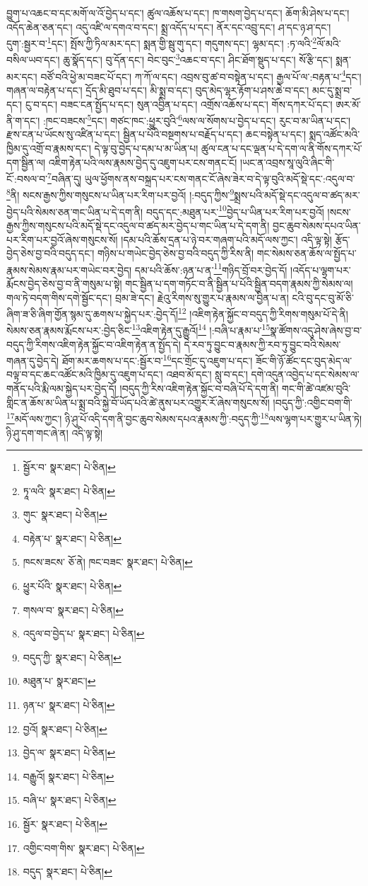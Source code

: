 བྱུག་པ་འཆང་བ་དང་མགོ་ལ་འོ་བྱེད་པ་དང་། ཚུལ་འཆོས་པ་དང་། ཁ་གསག་བྱེད་པ་དང་། ཆོག་མི་ཤེས་པ་དང་། འདོད་ཆེན་ཅན་དང་། འདུ་འཛི་ལ་དགའ་བ་དང་། སྨྲ་འདོད་པ་དང་། ནོར་དང་འབྲུ་དང་། ཤ་དང་ཉ་ཤ་དང་། དུག་:སྦྱར་བ་\footnote{སྦྱོར་བ་  སྣར་ཐང་།  པེ་ཅིན། }དང་། སྤོས་ཀྱི་ཏིལ་མར་དང་། སྨན་གྱི་སྦུ་གུ་དང་། གདུགས་དང་། ལྷམ་དང་། :ཏ་ལའི་\footnote{ཏཱ་ལའི་  སྣར་ཐང་།  པེ་ཅིན། }ལོ་མའི་བསིལ་ཡབ་དང་། ཆུ་སྣོད་དང་། བུ་དོན་དང་། བེང་བུང་\footnote{གུང་  སྣར་ཐང་།  པེ་ཅིན། }འཆང་བ་དང་། ཤིང་ཐོག་སྡུད་པ་དང་། སོ་རྩི་དང་། སྨན་མར་དང་། བཙོ་བའི་ཕྱེ་མ་བཟང་པོ་དང་། ཀ་ཀོ་ལ་དང་། འབྲས་བུ་ཚ་བ་བསྟེན་པ་དང་། རྒྱལ་པོ་ལ་:བརྟན་པ་\footnote{བརྟེན་པ་  སྣར་ཐང་།  པེ་ཅིན། }དང་། གཞན་ལ་བརྟེན་པ་དང་། དྲོད་མི་ཐུབ་པ་དང་། མི་སྨྲ་བ་དང་། བུད་མེད་ལྷར་རྟོག་པ་ཤས་ཆེ་བ་དང་། མང་དུ་སྨྲ་བ་དང་། ངུ་བ་དང་། བཟང་ངན་སྤྱོད་པ་དང་། སུན་འབྱིན་པ་དང་། འགྲོས་འཆོས་པ་དང་། གོས་དཀར་པོ་དང་། ཨར་མོ་ནི་ག་དང་། :ཁང་བཟངས་\footnote{ཁངས་ཟངས་  ཅོ་ནེ། ཁང་བཟང་  སྣར་ཐང་།  པེ་ཅིན། }དང་། གཙང་ཁང་:ཕྱུར་བུའི་\footnote{ཕྱུར་པོའི་  སྣར་ཐང་།  པེ་ཅིན། }ལས་ལ་སོགས་པ་བྱེད་པ་དང་། རུང་བ་མ་ཡིན་པ་དང་། རྫས་ངན་པ་ཡོངས་སུ་འཛིན་པ་དང་། སྦྱིན་པ་པོའི་བསྔགས་པ་བརྗོད་པ་དང་། ཆང་བསྟེན་པ་དང་། སྨད་འཚོང་མའི་ཁྱིམ་དུ་འགྲོ་བ་རྣམས་དང་། དེ་ལྟ་བུ་བྱེད་པ་དམ་པ་མ་ཡིན་པ། ཚུལ་ངན་པ་དང་ལྡན་པ་དེ་དག་ལ་ནི་གོས་དཀར་པོ་དག་སྦྱིན་ལ། འཇིག་རྟེན་པའི་ལས་རྣམས་བྱེད་དུ་འཇུག་པར་ངས་གནང་ངོ། །ཡང་ན་འབྲས་སཱ་ལུའི་ཞིང་གི་ངོ་:བསལ་བ་\footnote{གསལ་བ་  སྣར་ཐང་།  པེ་ཅིན། }བཞིན་དུ། ཡུལ་ཕྱོགས་ནས་བསྐྲད་པར་ངས་གནང་ངོ་ཞེས་ཟེར་བ་དེ་ལྟ་བུའི་མདོ་སྡེ་དང་:འདུལ་བ་\footnote{འདུལ་བ་བྱེད་པ་  སྣར་ཐང་།  པེ་ཅིན། }ནི། སངས་རྒྱས་ཀྱིས་གསུངས་པ་ཡིན་པར་རིག་པར་བྱའོ། །:བདུད་ཀྱིས་\footnote{བདུད་ཀྱི་  སྣར་ཐང་།  པེ་ཅིན། }སྨྲས་པའི་མདོ་སྡེ་དང་འདུལ་བ་ཚད་མར་བྱེད་པའི་སེམས་ཅན་གང་ཡིན་པ་དེ་དག་ནི། བདུད་དང་:མཐུན་པར་\footnote{མཐུན་པ་  སྣར་ཐང་། }བྱེད་པ་ཡིན་པར་རིག་པར་བྱའོ། །སངས་རྒྱས་ཀྱིས་གསུངས་པའི་མདོ་སྡེ་དང་འདུལ་བ་ཚད་མར་བྱེད་པ་གང་ཡིན་པ་དེ་དག་ནི། བྱང་ཆུབ་སེམས་དཔའ་ཡིན་པར་རིག་པར་བྱའོ་ཞེས་གསུངས་སོ། །དམ་པའི་ཆོས་དྲན་པ་ཉེ་བར་གཞག་པའི་མདོ་ལས་ཀྱང་། འདི་ལྟ་སྟེ། རྩོད་བྱེད་ཅེས་བྱ་བའི་བདུད་དང་། གཉིས་པ་གཡེང་བྱེད་ཅེས་བྱ་བའི་བདུད་ཀྱི་རིས་ནི། གང་སེམས་ཅན་ཆོས་ལ་སྤྱོད་པ་རྣམས་སེམས་རྣམ་པར་གཡེང་བར་བྱེད། དམ་པའི་ཆོས་:ཉན་པ་ན་\footnote{ཉན་པ་  སྣར་ཐང་།  པེ་ཅིན། }གཉིད་བྲོ་བར་བྱེད་དོ། །འདོད་པ་ལྷག་པར་རྨོངས་བྱེད་ཅེས་བྱ་བ་ནི་གསུམ་པ་སྟེ། གང་སྦྱིན་པ་དག་གཏོང་བ་ནི་སྦྱིན་པ་པོའི་སྦྱིན་བདག་རྣམས་ཀྱི་སེམས་ལ། གལ་ཏེ་བདག་གིས་དགེ་སྦྱོང་དང་། བྲམ་ཟེ་དང་། རྗེའུ་རིགས་སུ་གྱུར་པ་རྣམས་ལ་བྱིན་པ་ན། ངའི་བུ་དང་བུ་མོ་ཅི་ཞིག་ཟ་ཅི་ཞིག་གྱོན་སྙམ་དུ་ཆགས་པ་སྐྱེད་པར་:བྱེད་དོ།\footnote{བྱའོ།  སྣར་ཐང་།  པེ་ཅིན། } །འཇིག་རྟེན་སྐྱོང་བ་བདུད་ཀྱི་རིགས་གསུམ་པོ་དེ་ནི། སེམས་ཅན་རྣམས་རྨོངས་པར་:བྱེད་ཅིང་\footnote{བྱེད་ལ་  སྣར་ཐང་།  པེ་ཅིན། }འཇིག་རྟེན་དུ་རྒྱུའོ།\footnote{བརྒྱུའོ།  སྣར་ཐང་།  པེ་ཅིན། } །:བཞི་པ་རྣམ་པ་\footnote{བཞི་པ་  སྣར་ཐང་།  པེ་ཅིན། }སྣ་ཚོགས་འདུ་ཤེས་ཞེས་བྱ་བ་བདུད་ཀྱི་རིགས་འཇིག་རྟེན་སྐྱོང་བ་འཇིག་རྟེན་ན་སྤྱོད་དེ། དེ་རབ་ཏུ་བྱུང་བ་རྣམས་ཀྱི་རབ་ཏུ་བྱུང་བའི་སེམས་གཞན་དུ་བྱེད་དེ། ཐོག་མར་ཆགས་པ་དང་:སྦྱོར་བ་\footnote{སྦྱོར་  སྣར་ཐང་།  པེ་ཅིན། }དང་གྲོང་དུ་འཇུག་པ་དང་། ཟོང་གི་ཉོ་ཚོང་དང་བུད་མེད་ལ་བལྟ་བ་དང་ཆང་འཚོང་མའི་ཁྱིམ་དུ་འཇུག་པ་དང་། འཐབ་མོ་དང་། སླུ་བ་དང་། དགེ་འདུན་འབྱེད་པ་དང་སེམས་ལ་གནོད་པའི་རྨི་ལམ་སྐྱེད་པར་བྱེད་དོ། །བདུད་ཀྱི་རིས་འཇིག་རྟེན་སྐྱོང་བ་བཞི་པོ་དེ་དག་ནི། གང་གི་ཚེ་འཛམ་བུའི་གླིང་ན་ཆོས་མ་ཡིན་པ་སྨྲ་བའི་སྐྱེ་བོ་ཡོད་པའི་ཚེ་ནུས་པར་འགྱུར་རོ་ཞེས་གསུངས་སོ། །བདུད་ཀྱི་:འགྱིང་བག་གི་\footnote{འགྱིང་བག་གིས་  སྣར་ཐང་།  པེ་ཅིན། }མདོ་ལས་ཀྱང་། ཉི་ཤུ་པོ་འདི་དག་ནི་བྱང་ཆུབ་སེམས་དཔའ་རྣམས་ཀྱི་:བདུད་ཀྱི་\footnote{བདུད་  སྣར་ཐང་།  པེ་ཅིན། }ལས་ལྷག་པར་གྱུར་པ་ཡིན་ཏེ། ཉི་ཤུ་དག་གང་ཞེ་ན། འདི་ལྟ་སྟེ། 